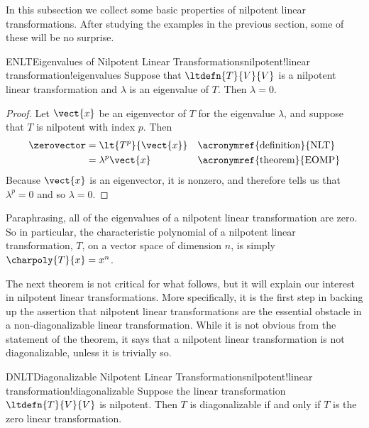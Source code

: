 %
%
In this subsection we collect some basic properties of nilpotent linear transformations.  After studying the examples in the previous section, some of these will be no surprise.
%
\begin{theorem}{ENLT}{Eigenvalues of Nilpotent Linear Transformations}{nilpotent!linear transformation!eigenvalues}
Suppose that $\ltdefn{T}{V}{V}$ is a nilpotent linear transformation and $\lambda$ is an eigenvalue of $T$.  Then $\lambda=0$.
\end{theorem}
%
\begin{proof}
Let $\vect{x}$ be an eigenvector of $T$ for the eigenvalue $\lambda$, and suppose that $T$ is nilpotent with index $p$.  Then
%
\begin{align*}
\zerovector
&=\lt{T^p}{\vect{x}}&&\text{\acronymref{definition}{NLT}}\\
&=\lambda^p\vect{x}&&\text{\acronymref{theorem}{EOMP}}
\end{align*}
%
Because $\vect{x}$ is an eigenvector, it is nonzero, and therefore  tells us that $\lambda^p=0$ and so $\lambda=0$.
%
\end{proof}
%
Paraphrasing, all of the eigenvalues of a nilpotent linear transformation are zero.  So in particular, the characteristic polynomial of a nilpotent linear transformation, $T$, on a vector space of dimension $n$, is simply $\charpoly{T}{x}=x^n$.\par
%
%
The next theorem is not critical for what follows, but it will explain our interest in nilpotent linear transformations.  More specifically, it is the first step in backing up the assertion that nilpotent linear transformations are the essential obstacle in a non-diagonalizable linear transformation.  While it is not obvious from the statement of the theorem, it says that a nilpotent linear transformation is not diagonalizable, unless it is trivially so.
%
\begin{theorem}{DNLT}{Diagonalizable Nilpotent Linear Transformations}{nilpotent!linear transformation!diagonalizable}
Suppose the linear transformation $\ltdefn{T}{V}{V}$ is nilpotent.   Then $T$ is diagonalizable if and only if $T$ is the zero linear transformation.
\end{theorem}
%
